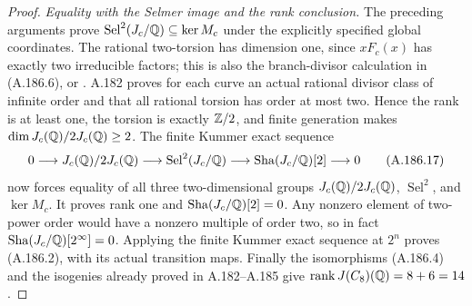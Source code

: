 \begin{proof}
\emph{Equality with the Selmer image and the rank conclusion.}
The preceding arguments prove
\(\operatorname{Sel}^2(J_c/\mathbb Q)\subseteq\ker M_c\)
under the explicitly specified global coordinates.
The rational two-torsion has dimension one, since
\(xF_c(x)\) has exactly two irreducible factors;
this is also the branch-divisor calculation in (A.186.6),
or \cite[Lemma 4.3(3), p.251]{LegStollDescent2001}.
A.182 proves for each curve an actual rational divisor
class of infinite order and that all rational torsion
has order at most two.  Hence the rank is at least one,
the torsion is exactly \(\mathbb Z/2\), and finite generation
makes \(\dim J_c(\mathbb Q)/2J_c(\mathbb Q)\geq2\).
The finite Kummer exact sequence
\[
0\longrightarrow J_c(\mathbb Q)/2J_c(\mathbb Q)
 \longrightarrow\operatorname{Sel}^{2}(J_c/\mathbb Q)
 \longrightarrow\operatorname{Sha}(J_c/\mathbb Q)[2]\longrightarrow0
\tag{A.186.17}
\]
now forces equality of all three two-dimensional groups
\(J_c(\mathbb Q)/2J_c(\mathbb Q)\), \(\operatorname{Sel}^{2}\),
and \(\ker M_c\).  It proves rank one and
\(\operatorname{Sha}(J_c/\mathbb Q)[2]=0\).  Any nonzero element of
two-power order would have a nonzero multiple of order
two, so in fact \(\operatorname{Sha}(J_c/\mathbb Q)[2^\infty]=0\).
Applying the finite Kummer exact sequence at \(2^n\)
proves (A.186.2), with its actual transition maps.
Finally the isomorphisms (A.186.4) and the isogenies
already proved in A.182--A.185 give
\(\operatorname{rank}J(C_8)(\mathbb Q)=8+6=14\).


\end{proof}

